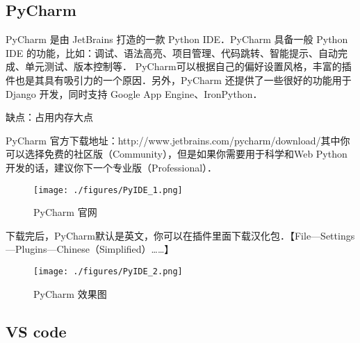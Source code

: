 
\begin{issues}
\issueTODO
\end{issues}

\subsection{PyCharm}

PyCharm 是由 JetBrains 打造的一款 Python IDE．PyCharm 具备一般 Python IDE 的功能，比如：调试、语法高亮、项目管理、代码跳转、智能提示、自动完成、单元测试、版本控制等． PyCharm可以根据自己的偏好设置风格，丰富的插件也是其具有吸引力的一个原因．另外，PyCharm 还提供了一些很好的功能用于 Django 开发，同时支持 Google App Engine、IronPython．

缺点：占用内存大点

PyCharm 官方下载地址：http://www.jetbrains.com/pycharm/download/其中你可以选择免费的社区版（Community），但是如果你需要用于科学和Web Python开发的话，建议你下一个专业版（Professional）．

\begin{figure}[ht]
\centering
\texttt{[image: ./figures/PyIDE\_1.png]}
\caption{PyCharm 官网} \label{PyIDE_fig1}
\end{figure}

下载完后，PyCharm默认是英文，你可以在插件里面下载汉化包．【File—Settings—Plugins—Chinese（Simplified）……】

\begin{figure}[ht]
\centering
\texttt{[image: ./figures/PyIDE\_2.png]}
\caption{PyCharm 效果图} \label{PyIDE_fig2}
\end{figure}

\subsection{VS code}
